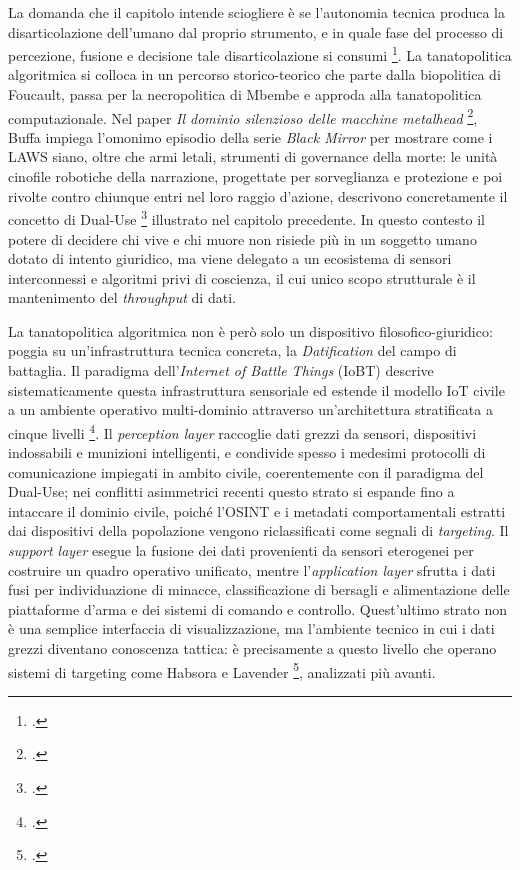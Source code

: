 \ifstampa\documentclass[a4paper,12pt,twoside,openright]{report}\else\documentclass[a4paper,12pt]{report}\fi
\begin{document}
La domanda che il capitolo intende sciogliere è se l'autonomia tecnica produca la
disarticolazione dell'umano dal proprio strumento, e in quale fase del processo
di percezione, fusione e decisione tale disarticolazione si consumi
\footcite{buffa_2025}. La tanatopolitica algoritmica si colloca in un percorso
storico-teorico che parte dalla biopolitica di Foucault, passa per la
necropolitica di Mbembe e approda alla tanatopolitica computazionale. Nel paper
\textit{Il dominio silenzioso delle macchine metalhead} \footcite{buffa_2025},
Buffa impiega l'omonimo episodio della serie \textit{Black Mirror} per mostrare
come i LAWS siano, oltre che armi letali, strumenti di governance della morte: le
unità cinofile robotiche della narrazione, progettate per sorveglianza e
protezione e poi rivolte contro chiunque entri nel loro raggio d'azione,
descrivono concretamente il concetto di Dual-Use \footcite{longpre_2022}
illustrato nel capitolo precedente. In questo contesto il potere di decidere chi
vive e chi muore non risiede più in un soggetto umano dotato di intento
giuridico, ma viene delegato a un ecosistema di sensori interconnessi e algoritmi
privi di coscienza, il cui unico scopo strutturale è il mantenimento del
\textit{throughput} di dati.

La tanatopolitica algoritmica non è però solo un dispositivo filosofico-giuridico:
poggia su un'infrastruttura tecnica concreta, la \textit{Datification} del campo
di battaglia. Il paradigma dell'\textit{Internet of Battle Things} (IoBT)
descrive sistematicamente questa infrastruttura sensoriale ed estende il modello
IoT civile a un ambiente operativo multi-dominio attraverso un'architettura
stratificata a cinque livelli \footcite{kufakunesu_2025_iobt}. Il
\textit{perception layer} raccoglie dati grezzi da sensori, dispositivi
indossabili e munizioni intelligenti, e condivide spesso i medesimi protocolli
di comunicazione impiegati in ambito civile, coerentemente con il paradigma del
Dual-Use; nei conflitti asimmetrici recenti questo strato si espande fino a
intaccare il dominio civile, poiché l'OSINT e i metadati comportamentali estratti
dai dispositivi della popolazione vengono riclassificati come segnali di
\textit{targeting}. Il \textit{support layer} esegue la fusione dei dati
provenienti da sensori eterogenei per costruire un quadro operativo unificato,
mentre l'\textit{application layer} sfrutta i dati fusi per individuazione di
minacce, classificazione di bersagli e alimentazione delle piattaforme d'arma e
dei sistemi di comando e controllo. Quest'ultimo strato non è una semplice
interfaccia di visualizzazione, ma l'ambiente tecnico in cui i dati grezzi
diventano conoscenza tattica: è precisamente a questo livello che operano sistemi
di targeting come Habsora e Lavender \footcite{oliveri_2024}, analizzati più
avanti.
\end{document}
